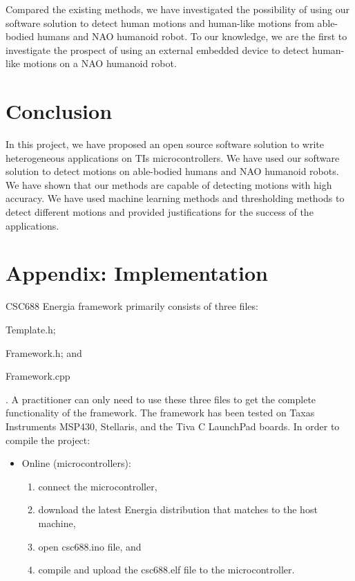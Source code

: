 \documentclass{llncs}
\begin{document}
\begin{sloppy}
Compared the existing methods, we have investigated the possibility of using our software solution
to detect human motions and human-like motions from able-bodied humans and NAO humanoid robot. To
our knowledge, we are the first to investigate the prospect of using an external embedded device to
detect human-like motions on a NAO humanoid robot. 

\section{Conclusion}

In this project, we have proposed an open source software solution to write heterogeneous
applications on TIs microcontrollers. We have used our software solution to detect motions on
able-bodied humans and NAO humanoid robots. We have shown that our methods are capable of detecting
motions with high accuracy. We have used machine learning methods and thresholding methods to
detect different motions and provided justifications for the success of the applications. 




\newpage
\section*{Appendix: Implementation}
\label{appendix:Implementation}
CSC688 Energia framework primarily consists of three files: \begin{inparaenum}[(1)] \item
\label{fmw:A} {\sf Template.h}; \item \label{fmw:B} {\sf Framework.h}; and \item \label{fmw:C} {\sf
Framework.cpp}\end{inparaenum}. A practitioner can only need to use these three files to get the
complete functionality of the framework. The framework has been tested on Taxas Instruments MSP430,
Stellaris, and the Tiva C LaunchPad boards. In order to compile the project:

\begin{itemize}
 \item Online (microcontrollers):
\begin{enumerate}
\item connect the microcontroller,
\item download the latest Energia distribution that matches to the host machine,
\item open {\sf csc688.ino} file, and 
\item compile and upload the {\sf csc688.elf} file to the microcontroller.
\end{enumerate}


\end{itemize}
\end{sloppy}
\end{document}
